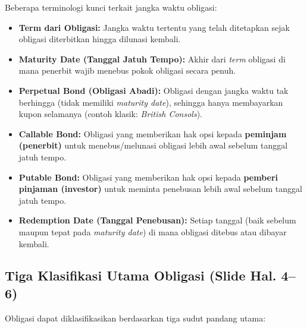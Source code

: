 \documentclass[11pt,a4paper]{article}
\begin{document}
Beberapa terminologi kunci terkait jangka waktu obligasi:
\begin{itemize}
    \item \textbf{Term dari Obligasi:} Jangka waktu tertentu yang telah ditetapkan sejak obligasi diterbitkan hingga dilunasi kembali.
    \item \textbf{Maturity Date (Tanggal Jatuh Tempo):} Akhir dari \textit{term} obligasi di mana penerbit wajib menebus pokok obligasi secara penuh.
    \item \textbf{Perpetual Bond (Obligasi Abadi):} Obligasi dengan jangka waktu tak berhingga (tidak memiliki \textit{maturity date}), sehingga hanya membayarkan kupon selamanya (contoh klasik: \textit{British Consols}).
    \item \textbf{Callable Bond:} Obligasi yang memberikan hak opsi kepada \textbf{peminjam (penerbit)} untuk menebus/melunasi obligasi lebih awal sebelum tanggal jatuh tempo.
    \item \textbf{Putable Bond:} Obligasi yang memberikan hak opsi kepada \textbf{pemberi pinjaman (investor)} untuk meminta penebusan lebih awal sebelum tanggal jatuh tempo.
    \item \textbf{Redemption Date (Tanggal Penebusan):} Setiap tanggal (baik sebelum maupun tepat pada \textit{maturity date}) di mana obligasi ditebus atau dibayar kembali.
\end{itemize}

\subsection{Tiga Klasifikasi Utama Obligasi (Slide Hal. 4--6)}

Obligasi dapat diklasifikasikan berdasarkan tiga sudut pandang utama:
\end{document}
